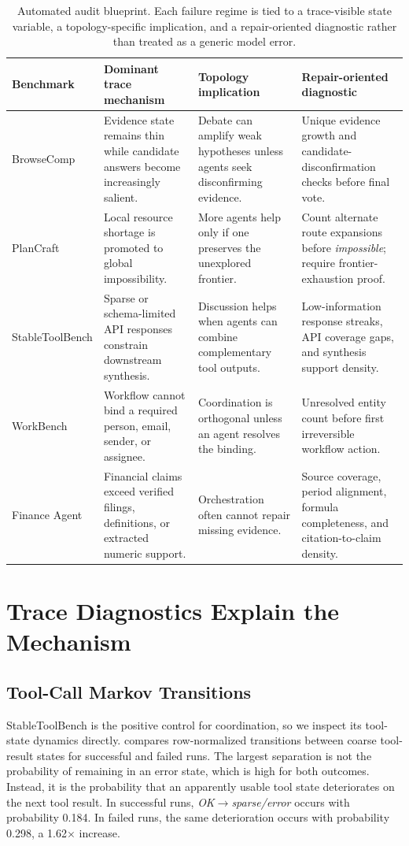 \documentclass{article}
\theoremstyle{plain}
\theoremstyle{definition}
\theoremstyle{remark}
\begin{document}
\begin{table}[t]
\centering
\small
\begin{tabular}{p{} p{} p{} p{}}
\toprule
Benchmark & Dominant trace mechanism & Topology implication & Repair-oriented diagnostic \\
\midrule
BrowseComp & Evidence state remains thin while candidate answers become increasingly salient. & Debate can amplify weak hypotheses unless agents seek disconfirming evidence. & Unique evidence growth and candidate-disconfirmation checks before final vote. \\
PlanCraft & Local resource shortage is promoted to global impossibility. & More agents help only if one preserves the unexplored frontier. & Count alternate route expansions before \emph{impossible}; require frontier-exhaustion proof. \\
StableToolBench & Sparse or schema-limited API responses constrain downstream synthesis. & Discussion helps when agents can combine complementary tool outputs. & Low-information response streaks, API coverage gaps, and synthesis support density. \\
WorkBench & Workflow cannot bind a required person, email, sender, or assignee. & Coordination is orthogonal unless an agent resolves the binding. & Unresolved entity count before first irreversible workflow action. \\
Finance Agent & Financial claims exceed verified filings, definitions, or extracted numeric support. & Orchestration often cannot repair missing evidence. & Source coverage, period alignment, formula completeness, and citation-to-claim density. \\
\bottomrule
\end{tabular}
\caption{Automated audit blueprint. Each failure regime is tied to a trace-visible state variable, a topology-specific implication, and a repair-oriented diagnostic rather than treated as a generic model error.}
\label{tab:regime_repair}
\end{table}

\section{Trace Diagnostics Explain the Mechanism}
\subsection{Tool-Call Markov Transitions}
StableToolBench is the positive control for coordination, so we inspect its tool-state dynamics directly.  compares row-normalized transitions between coarse tool-result states for successful and failed runs. The largest separation is not the probability of remaining in an error state, which is high for both outcomes. Instead, it is the probability that an apparently usable tool state deteriorates on the next tool result. In successful runs, \emph{OK}$\rightarrow$\emph{sparse/error} occurs with probability 0.184. In failed runs, the same deterioration occurs with probability 0.298, a 1.62$\times$ increase.
\end{document}
